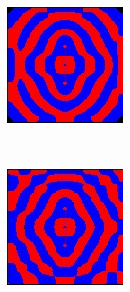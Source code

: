 \begin{figure}[p]
\bigskip
        \begin{subfigure}[b]{0.3\textwidth}
        \includegraphics[width=\textwidth]{include/graphics/pml-off-3}
    \end{subfigure}
    ~
    \begin{subfigure}[b]{0.3\textwidth}
        \includegraphics[width=\textwidth]{include/graphics/pml-off-4}

\end{subfigure}
\end{figure}
